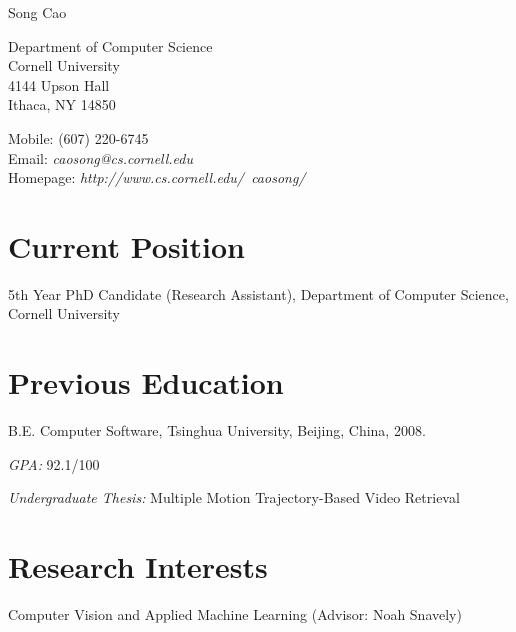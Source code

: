 \documentclass[10pt,letterpaper]{article}
\def\name{Song Cao}
\renewenvironment{itemize}{
  \begin{list}{}{
    \setlength{\leftmargin}{1.5em}
    \setlength{\itemsep}{0.25em}
    \setlength{\parskip}{0pt}
    \setlength{\parsep}{0.25em}
  }
}{
  \end{list}
}
\begin{document}
{\huge \name}


\vspace{0.25in}

\begin{minipage}[t]{0.5\textwidth}
  Department of Computer Science \\
  Cornell University \\
  4144 Upson Hall \\
  Ithaca, NY 14850
\end{minipage}
\begin{minipage}[t]{0.5\textwidth}
  Mobile: (607) 220-6745 \\
  Email: \textit{caosong@cs.cornell.edu} \\
  Homepage: \textit{http://www.cs.cornell.edu/~caosong/} \\
\end{minipage}

\section*{Current Position}
5th Year PhD Candidate (Research Assistant), Department of Computer
Science, Cornell University

\section*{Previous Education}
\begin{itemize}
    \item B.E. Computer Software, Tsinghua University, Beijing, China, 2008.

    \begin{itemize}
    \item \textit{GPA:}
      92.1/100
    \item \textit{Undergraduate Thesis:}
      Multiple Motion Trajectory-Based Video Retrieval
    \end{itemize}
\end{itemize}

\section*{Research Interests}
\begin{itemize}
\item Computer Vision and Applied Machine Learning (Advisor: Noah Snavely)
\end{itemize}
\end{document}
